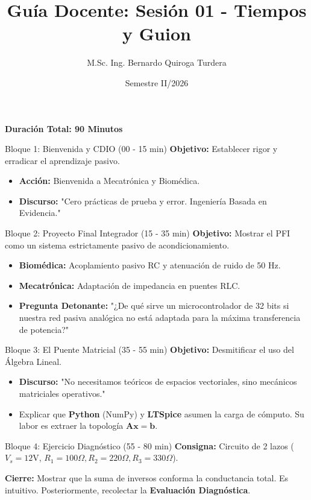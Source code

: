 \documentclass[aspectratio=169]{beamer}
\title{Guía Docente: Sesión 01 - Tiempos y Guion}
\author{M.Sc. Ing. Bernardo Quiroga Turdera}
\date{Semestre II/2026}
\begin{document}
\begin{frame}
    \titlepage
    \begin{center}
        \textbf{Duración Total: 90 Minutos}
    \end{center}
\end{frame}

\begin{frame}{Bloque 1: Bienvenida y CDIO (00 - 15 min)}
    \textbf{Objetivo:} Establecer rigor y erradicar el aprendizaje pasivo.
    \begin{itemize}
        \item \textbf{Acción:} Bienvenida a Mecatrónica y Biomédica.
        \item \textbf{Discurso:} "Cero prácticas de prueba y error. Ingeniería Basada en Evidencia."
    \end{itemize}
\end{frame}

\begin{frame}{Bloque 2: Proyecto Final Integrador (15 - 35 min)}
    \textbf{Objetivo:} Mostrar el PFI como un sistema estrictamente pasivo de acondicionamiento.
    \begin{itemize}
        \item \textbf{Biomédica:} Acoplamiento pasivo RC y atenuación de ruido de 50 Hz.
        \item \textbf{Mecatrónica:} Adaptación de impedancia en puentes RLC.
        \item \textbf{Pregunta Detonante:} "¿De qué sirve un microcontrolador de 32 bits si nuestra red pasiva analógica no está adaptada para la máxima transferencia de potencia?"
    \end{itemize}
\end{frame}

\begin{frame}{Bloque 3: El Puente Matricial (35 - 55 min)}
    \textbf{Objetivo:} Desmitificar el uso del Álgebra Lineal.
    \begin{itemize}
        \item \textbf{Discurso:} "No necesitamos teóricos de espacios vectoriales, sino mecánicos matriciales operativos."
        \item Explicar que \textbf{Python} (NumPy) y \textbf{LTSpice} asumen la carga de cómputo. Su labor es extraer la topología $\mathbf{A}\mathbf{x} = \mathbf{b}$.
    \end{itemize}
\end{frame}

\begin{frame}{Bloque 4: Ejercicio Diagnóstico (55 - 80 min)}
    \textbf{Consigna:} Circuito de 2 lazos ($V_s = 12\text{V}$, $R_1=100\Omega, R_2=220\Omega, R_3=330\Omega$).
    \vspace{0.3cm}
    
    \textbf{Cierre:} Mostrar que la suma de inversos conforma la conductancia total. Es intuitivo. Posteriormente, recolectar la \textbf{Evaluación Diagnóstica}.
\end{frame}
\end{document}
